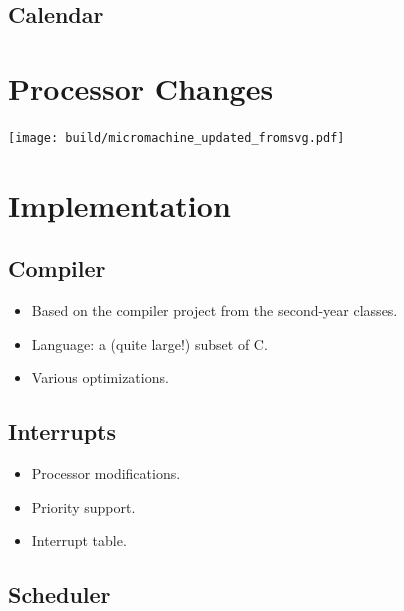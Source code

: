 \documentclass{beamer}
\begin{document}
    \subsection{Calendar}

  \section{Processor Changes}
    \begin{landscape}
        \begin{frame}
            \texttt{[image: build/micromachine\_updated\_fromsvg.pdf]}

        \end{frame}
    \end{landscape}
  \section{Implementation}

    \subsection{Compiler}

    \begin{frame}
      \begin{itemize}
        \item Based on the compiler project from the second-year classes.
        \item Language: a (quite large!) subset of C.
        \item Various optimizations.
      \end{itemize}
    \end{frame}

    \subsection{Interrupts}

    \begin{frame}
      \begin{itemize}
        \item Processor modifications.
        \item Priority support.
        \item Interrupt table.
      \end{itemize}
    \end{frame}

    \subsection{Scheduler}
\end{document}
